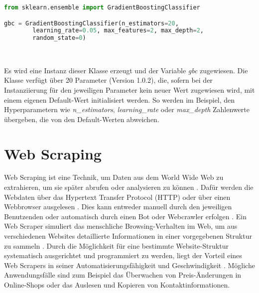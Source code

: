 \documentclass[german,bachelor]{swsLeipzig}
\begin{document}
\begin{minipage}{\linewidth}
\begin{lstlisting}[language=Python, frame=single, basicstyle=\small]
from sklearn.ensemble import GradientBoostingClassifier

gbc = GradientBoostingClassifier(n_estimators=20,
        learning_rate=0.05, max_features=2, max_depth=2,
        random_state=0)
\end{lstlisting}
\end{minipage}
\

Es wird eine Instanz dieser Klasse erzeugt und der Variable \textit{gbc} zugewiesen.
Die Klasse verfügt über 20 Parameter (Version 1.0.2), die, sofern bei der Instanziierung für den jeweiligen Parameter
kein neuer Wert zugewiesen wird, mit einem eigenen Default-Wert initialisiert werden.
So werden im Beispiel, den Hyperparametern wie \textit{n\_estimators}, \textit{learning\_rate} oder \textit{max\_depth}
Zahlenwerte übergeben, die von den Default-Werten abweichen.\\


\section{Web Scraping}
Web Scraping ist eine Technik, um Daten aus dem World Wide Web zu extrahieren, um sie später abrufen oder analysieren zu können \cite[S. 1]{zhao2017web}.
Dafür werden die Webdaten über das Hypertext Transfer Protocol (HTTP) oder über einen Webbrowser ausgelesen \cite[S. 1]{zhao2017web}.
Dies kann entweder manuell durch den jeweiligen Benutzenden oder automatisch durch einen Bot oder Webcrawler erfolgen \cite[S. 1]{zhao2017web}.
Ein Web Scraper simuliert das menschliche Browsing-Verhalten im Web, um aus verschiedenen Websites
detaillierte Informationen in einer vorgegebenen Struktur zu sammeln \cite[S. 6040]{9005594}.
Durch die Möglichkeit für eine bestimmte Website-Struktur systematisch ausgerichtet und programmiert zu werden, liegt der Vorteil
eines Web Scrapers in seiner Automatisierungsfähigkeit und Geschwindigkeit \cite[S. 6040]{9005594}.
Mögliche Anwendungsfälle sind zum Beispiel das Überwachen von Preis-Änderungen in Online-Shops oder das Auslesen und Kopieren
von Kontaktinformationen.\\
\end{document}
